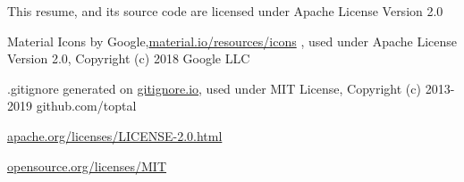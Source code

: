 \hspace{1pt}

\tiny{

This resume, and its source code are licensed under Apache License Version 2.0

Material Icons by Google,{\secondaryColor\href{https://material.io/resources/icons}{material.io/resources/icons} }, used under Apache License Version 2.0, Copyright (c) 2018 Google LLC

.gitignore generated on {\secondaryColor\href{https://gitignore.io}{gitignore.io}}, used under MIT License, Copyright (c) 2013-2019 github.com/toptal

\secondaryColor\href{https://www.apache.org/licenses/LICENSE-2.0.html}{apache.org/licenses/LICENSE-2.0.html}

\secondaryColor\href{https://opensource.org/licenses/MIT}{opensource.org/licenses/MIT}


}